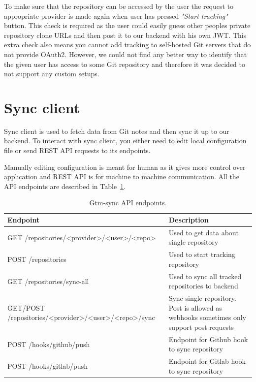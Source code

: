 To make sure that the repository can be accessed by the user the request to appropriate provider is made again
when user has pressed \textit{"Start tracking"} button.
This check is required as the user could easily guess other peoples private repository clone URLs and then post
it to our backend with his own JWT.
This extra check also means you cannot add tracking to self-hosted Git servers that do not provide OAuth2.
However, we could not find any better way to identify that the given user has access to some Git repository and
therefore it was decided to not support any custom setups.

\section{Sync client}\label{sec:sync-client-content}
Sync client is used to fetch data from Git notes and then sync it up to our backend.
To interact with sync client, you either need to edit local configuration file or send REST API requests to its endpoints.

Manually editing configuration is meant for human as it gives more control over application and REST API is
for machine to machine communication.
All the API endpoints are described in Table~\ref{tab:gtm-sync-endpoints}.

\begin{table}[H]
    \centering
    \begin{tabular}{ | p{8cm} | p{6cm} |}
        \hline
        \textbf{Endpoint} & \textbf{Description}\\
        \hline
        GET /repositories/<provider>/<user>/<repo> & Used to get data about single repository \\
        \hline
        POST /repositories & Used to start tracking repository\\
        \hline
        GET /repositories/sync-all & Used to sync all tracked repositories to backend\\
        \hline
        GET/POST /repositories/<provider>/<user>/<repo>/sync & Sync single repository.
        Post is allowed as webhooks sometimes only support post requests\\
        \hline
        POST /hooks/github/push & Endpoint for Github hook to sync repository\\
        \hline
        POST /hooks/gitlab/push & Endpoint for Gitlab hook to sync repository\\
        \hline
    \end{tabular}
    \caption{Gtm-sync API endpoints.}
    \label{tab:gtm-sync-endpoints}
\end{table}

